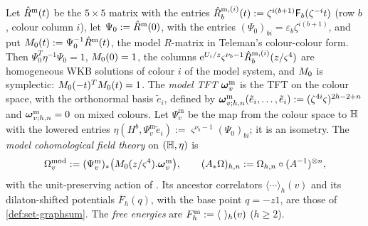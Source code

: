 \begin{defn}
\label{def:set-M0}
Let $\hat{R}^{\mathrm m}(t)$ be the $5\times5$ matrix with the entries $\hat{R}^{\mathrm m,(i)}_b(t):=\zeta^{i(b+1)}\mathsf{F}_b(\zeta^{-i}t)$ (row $b$, colour column $i$), let $\Psi_0:=\hat{R}^{\mathrm m}(0)$, with the entries $(\Psi_0)_{bi}=\varepsilon_b\zeta^{i(b+1)}$, and put $M_{0}(t):=\Psi_0^{-1}\hat{R}^{\mathrm m}(t)$, the model $R$-matrix in Teleman's colour-colour form. Then $\Psi_0^T\eta^{-1}\Psi_0=1$, $M_{0}(0)=1$, the columns $\mathrm{e}^{U_i/z}\varsigma^{\nu_b-1}\hat{R}^{\mathrm m,(i)}_b(z/\varsigma^4)$ are homogeneous WKB solutions of colour $i$ of the model system, and $M_{0}$ is symplectic: $M_{0}(-t)^TM_{0}(t)=1$. The \emph{model TFT} $\boldsymbol{\omega}^{\mathrm m}_v$ is the TFT on the colour space, with the orthonormal basis $\tilde e_i$, defined by $\boldsymbol{\omega}^{\mathrm m}_{v;h,n}(\tilde e_i,\dots,\tilde e_i):=(\zeta^{4i}\varsigma)^{2h-2+n}$ and $\boldsymbol{\omega}^{\mathrm m}_{v;h,n}=0$ on mixed colours. Let $\Psi^{\mathrm m}_v$ be the map from the colour space to $\mathbb{H}$ with the lowered entries $\eta(H^b,\Psi^{\mathrm m}_v\tilde e_i):=\varsigma^{\nu_b-1}(\Psi_0)_{bi}$; it is an isometry. The \emph{model cohomological field theory} on $(\mathbb{H},\eta)$ is
\[
\Omega^{\mathrm{mod}}_v:=(\Psi^{\mathrm m}_v)_*\bigl(M_{0}(z/\varsigma^4).\boldsymbol{\omega}^{\mathrm m}_v\bigr),\qquad(A_*\Omega)_{h,n}:=\Omega_{h,n}\circ(A^{-1})^{\otimes n},
\]
with the unit-preserving action of \cite[Defs.~2.5, 2.13]{PPZ15}. Its ancestor correlators $\langle\cdots\rangle_h(v)$ and its dilaton-shifted potentials $\overline F_h(q)$, with the base point $q=-z1$, are those of \cref{def:set-graphsum}. The \emph{free energies} are $\Fm_h:=\langle\ \rangle_h(v)$ ($h\geq2$).
\label{def:set-modcohft}
\end{defn}



